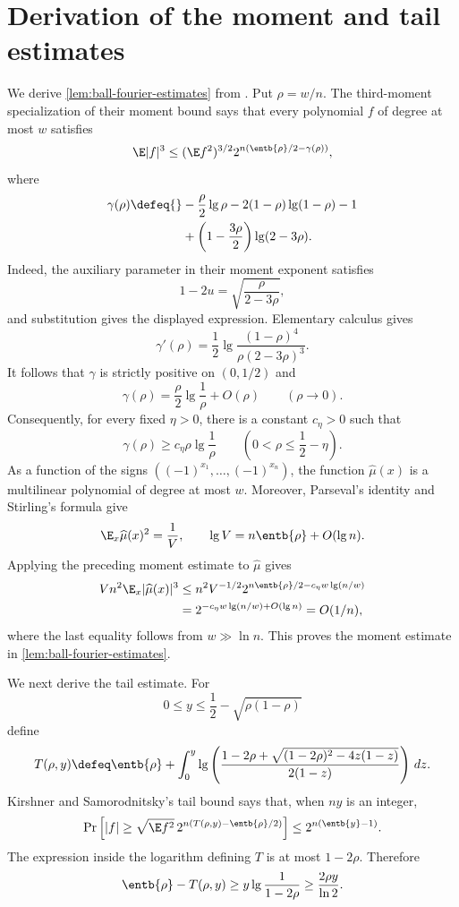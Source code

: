 \section{Derivation of the moment and tail estimates}
\label{sec:moment-tail-derivation}

We derive \autoref{lem:ball-fourier-estimates} from
\cite[Corollary 1.4 and Theorem 1.5]{KirshnerS2021}.
Put $\rho=w/n$.  The third-moment specialization of their moment bound
says that every polynomial $f$ of degree at most $w$ satisfies
$$
\E|f|^3
\le
(\E f^2)^{3/2}
2^{n(\entb{\rho}/2-\gamma(\rho))},
$$
where
$$
\begin{aligned}
\gamma(\rho)\defeq{}&
-\frac{\rho}{2}\lg \rho-2(1-\rho)\lg(1-\rho)-1\\
&+\left(1-\frac{3\rho}{2}\right)\lg(2-3\rho).
\end{aligned}
$$
Indeed, the auxiliary parameter in their moment exponent satisfies
$$
1-2u=\sqrt{\frac{\rho}{2-3\rho}},
$$
and substitution gives the displayed expression.  Elementary
calculus gives
$$
\gamma'(\rho)
=\frac12\lg\frac{(1-\rho)^4}{\rho(2-3\rho)^3}.
$$
It follows that $\gamma$ is strictly positive on $(0,1/2)$ and
$$
\gamma(\rho)=\frac{\rho}{2}\lg\frac1\rho+O(\rho)
\qquad(\rho\longrightarrow0).
$$
Consequently, for every fixed $\eta>0$, there is a constant
$c_\eta>0$ such that
$$
\gamma(\rho)\ge c_\eta \rho\lg\frac1\rho
\qquad
\left(0<\rho\le\frac12-\eta\right).
$$
As a function of the signs
$((-1)^{x_1},\ldots,(-1)^{x_n})$, the function
$\widehat\mu(x)$ is a multilinear polynomial of degree at most
$w$.  Moreover, Parseval's identity and Stirling's formula give
$$
\E_x\widehat\mu(x)^2=\frac1V,
\qquad
\lg V=n\entb{\rho}+O(\lg n).
$$
Applying the preceding moment estimate to $\widehat\mu$ gives
$$
\begin{aligned}
Vn^2\E_x|\widehat\mu(x)|^3
&\le
n^2V^{-1/2}
2^{n\entb{\rho}/2-c_\eta w\lg(n/w)}\\
&=
2^{-c_\eta w\lg(n/w)+O(\lg n)}
=O(1/n),
\end{aligned}
$$
where the last equality follows from $w\gg\ln n$.
This proves the moment estimate in
\autoref{lem:ball-fourier-estimates}.

We next derive the tail estimate.  For
$$
0\le y\le\frac12-\sqrt{\rho(1-\rho)}
$$
define
$$
T(\rho,y)
\defeq
\entb{\rho}+
\int_0^y
\lg\left(
\frac{1-2\rho+\sqrt{(1-2\rho)^2-4z(1-z)}}{2(1-z)}
\right)\,dz.
$$
Kirshner and Samorodnitsky's tail bound says that, when $ny$ is an
integer,
$$
\Pr\left[
|f|\ge
\sqrt{\E f^2}\,
2^{n(T(\rho,y)-\entb{\rho}/2)}
\right]
\le
2^{n(\entb{y}-1)}.
$$
The expression inside the logarithm defining $T$ is at most
$1-2\rho$.  Therefore
$$
\entb{\rho}-T(\rho,y)
\ge y\lg\frac1{1-2\rho}
\ge\frac{2\rho y}{\ln2}.
$$

